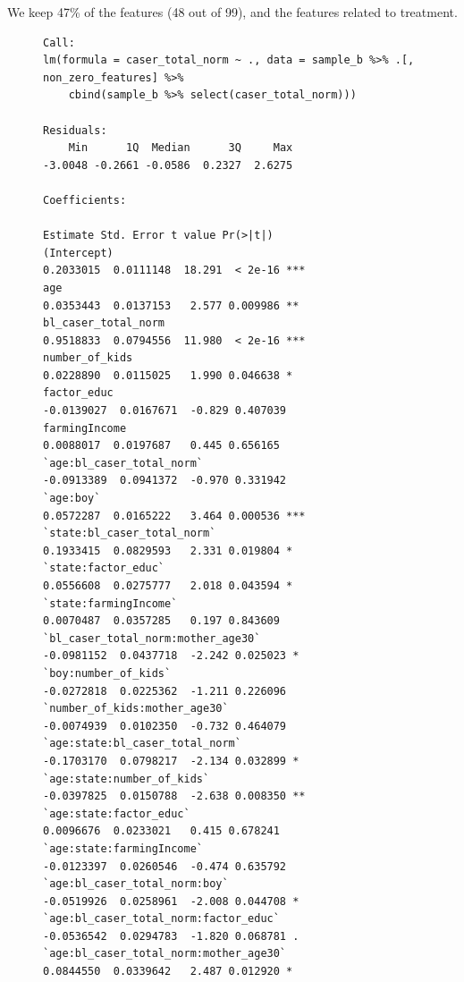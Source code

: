 \documentclass{article}
\begin{document}
We keep 47\% of the features (48 out of 99), and the features related to treatment.

\begin{figure}[H]
  \begin{lstlisting}[style=RstyleCommentSmall, caption=CATE with Controls selected by LASSO]
Call:
lm(formula = caser_total_norm ~ ., data = sample_b %>% .[, non_zero_features] %>% 
    cbind(sample_b %>% select(caser_total_norm)))

Residuals:
    Min      1Q  Median      3Q     Max 
-3.0048 -0.2661 -0.0586  0.2327  2.6275 

Coefficients:
                                                    Estimate Std. Error t value Pr(>|t|)    
(Intercept)                                        0.2033015  0.0111148  18.291  < 2e-16 ***
age                                                0.0353443  0.0137153   2.577 0.009986 ** 
bl_caser_total_norm                                0.9518833  0.0794556  11.980  < 2e-16 ***
number_of_kids                                     0.0228890  0.0115025   1.990 0.046638 *  
factor_educ                                       -0.0139027  0.0167671  -0.829 0.407039    
farmingIncome                                      0.0088017  0.0197687   0.445 0.656165    
`age:bl_caser_total_norm`                         -0.0913389  0.0941372  -0.970 0.331942    
`age:boy`                                          0.0572287  0.0165222   3.464 0.000536 ***
`state:bl_caser_total_norm`                        0.1933415  0.0829593   2.331 0.019804 *  
`state:factor_educ`                                0.0556608  0.0275777   2.018 0.043594 *  
`state:farmingIncome`                              0.0070487  0.0357285   0.197 0.843609    
`bl_caser_total_norm:mother_age30`                -0.0981152  0.0437718  -2.242 0.025023 *  
`boy:number_of_kids`                              -0.0272818  0.0225362  -1.211 0.226096    
`number_of_kids:mother_age30`                     -0.0074939  0.0102350  -0.732 0.464079    
`age:state:bl_caser_total_norm`                   -0.1703170  0.0798217  -2.134 0.032899 *  
`age:state:number_of_kids`                        -0.0397825  0.0150788  -2.638 0.008350 ** 
`age:state:factor_educ`                            0.0096676  0.0233021   0.415 0.678241    
`age:state:farmingIncome`                         -0.0123397  0.0260546  -0.474 0.635792    
`age:bl_caser_total_norm:boy`                     -0.0519926  0.0258961  -2.008 0.044708 *  
`age:bl_caser_total_norm:factor_educ`             -0.0536542  0.0294783  -1.820 0.068781 .  
`age:bl_caser_total_norm:mother_age30`             0.0844550  0.0339642   2.487 0.012920 *  

\end{lstlisting}
\end{figure}
\end{document}
